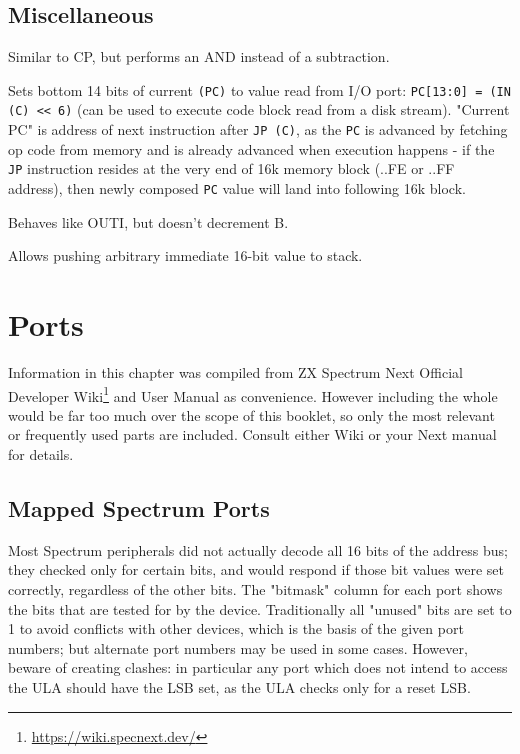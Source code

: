 \documentclass[oneside,a4paper]{book}
\begin{document}
\subsection{Miscellaneous}

\begin{description}


	Similar to CP, but performs an AND instead of a subtraction.
	

	Sets bottom 14 bits of current {\tt (PC)} to value read from I/O port: {\tt PC[13:0] = (IN (C) << 6)} (can be used to execute code block read from a disk stream). "Current PC" is address of next instruction after {\tt JP (C)}, as the {\tt PC} is advanced by fetching op code from memory and is already advanced when execution happens - if the {\tt JP} instruction resides at the very end of 16k memory block (..FE or ..FF address), then newly composed {\tt PC} value will land into following 16k block.


	Behaves like OUTI, but doesn't decrement B.


	Allows pushing arbitrary immediate 16-bit value to stack.

\end{description}


\section{Ports}

Information in this chapter was compiled from ZX Spectrum Next Official Developer Wiki\footnote{\url{https://wiki.specnext.dev/}} and User Manual as convenience. However including the whole would be far too much over the scope of this booklet, so only the most relevant or frequently used parts are included. Consult either Wiki or your Next manual for details.


\subsection{Mapped Spectrum Ports}

Most Spectrum peripherals did not actually decode all 16 bits of the address bus; they checked only for certain bits, and would respond if those bit values were set correctly, regardless of the other bits. The "bitmask" column for each port shows the bits that are tested for by the device. Traditionally all "unused" bits are set to 1 to avoid conflicts with other devices, which is the basis of the given port numbers; but alternate port numbers may be used in some cases. However, beware of creating clashes: in particular any port which does not intend to access the ULA should have the LSB set, as the ULA checks only for a reset LSB.
\end{document}
